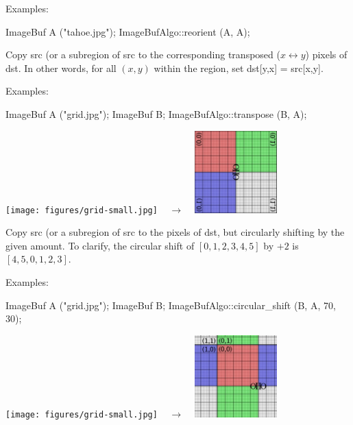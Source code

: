 \smallskip
\noindent Examples:
\begin{code}
    ImageBuf A ("tahoe.jpg");
    ImageBufAlgo::reorient (A, A);
\end{code}
\apiend


 
Copy {\cf src} (or a subregion of {\cf src} to the corresponding 
transposed ($x \leftrightarrow y$) pixels
of {\cf dst}.  In other words, for all $(x,y)$ within the region,
set {\cf dst[y,x] = src[x,y]}.

\smallskip
\noindent Examples:
\begin{code}
    ImageBuf A ("grid.jpg");
    ImageBuf B;
    ImageBufAlgo::transpose (B, A);
\end{code}
\spc \texttt{[image: figures/grid-small.jpg]}
~ {\Huge $\rightarrow$} ~
\includegraphics[width=1.25in]{figures/transpose.jpg} \\
\apiend


 

Copy {\cf src} (or a subregion of {\cf src} to the pixels of {\cf dst},
but circularly shifting by the given amount.  To clarify, the circular
shift of $[0,1,2,3,4,5]$ by $+2$ is $[4,5,0,1,2,3]$.

\smallskip
\noindent Examples:
\begin{code}
    ImageBuf A ("grid.jpg");
    ImageBuf B;
    ImageBufAlgo::circular_shift (B, A, 70, 30);
\end{code}
\spc \texttt{[image: figures/grid-small.jpg]} 
~ {\Huge $\rightarrow$} ~
\includegraphics[width=1.25in]{figures/cshift.jpg} \\
\apiend


